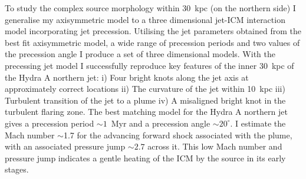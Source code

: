 To study the complex source morphology within 30~kpc (on the northern side) I generalise my axisymmetric model to a three dimensional jet-ICM interaction model incorporating jet precession. Utilising the jet parameters obtained from the best fit axisymmetric model, a wide range of precession periods and two values of the precession angle I produce a set of three dimensional models. With the precessing jet model I successfully reproduce key features of the inner 30~kpc of the Hydra A northern jet: i) Four bright knots along the jet axis at approximately correct locations ii) The curvature of the jet within 10~kpc iii) Turbulent transition of the jet to a plume iv) A misaligned bright knot in the turbulent flaring zone. The best matching model for the Hydra A northern jet gives a precession period $\sim1$~Myr and a precession angle $\sim20^{\circ}$. I estimate the Mach number $\sim$1.7 for the advancing forward shock associated with the plume, with an associated pressure jump $\sim2.7$ across it. This low Mach number and pressure jump indicates a gentle heating of the ICM by the source in its early stages.  




